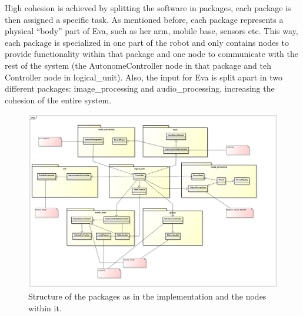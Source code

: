 \documentclass[technical_document.tex]{subfiles}
\begin{document}
High cohesion is achieved by splitting the software in packages, each package is then assigned a specific task. As mentioned before, each package represents a physical ``body'' part of Eva, such as her arm, mobile base, sensors etc. This way, each package is specialized in one part of the robot and only contains nodes to provide functionality within that package and one node to communicate with the rest of the system (the AutonomeController node in that package and teh Controller node in logical\_unit). Also, the input for Eva is split apart in two different packages: image\_processing and audio\_processing, increasing the cohesion of the entire system. 


\begin{figure}[ht!]
	\centering
	\mbox{\includegraphics[scale=0.3]{Images/nodes.png}}
	\caption{Structure of the packages as in the implementation and the nodes within it.}
	\label{fig:implementation}
\end{figure}
\end{document}
